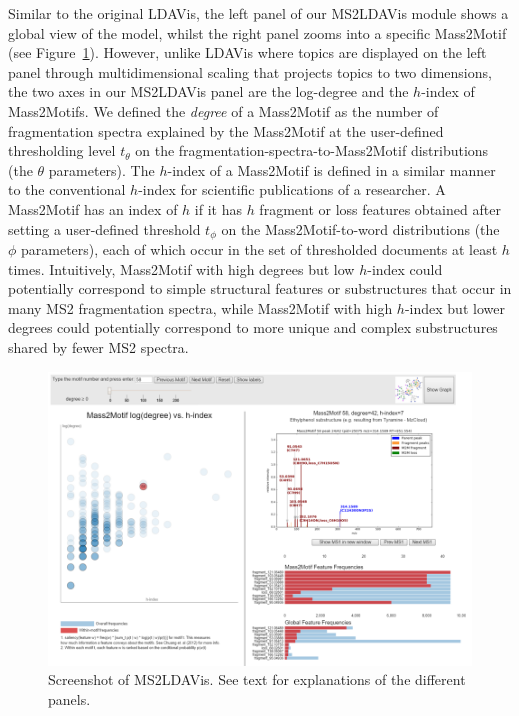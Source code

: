 Similar to the original LDAVis, the left panel of our MS2LDAVis module shows a global view of the model, whilst the right panel zooms into a specific Mass2Motif (see Figure~\ref{fig:m2ldavis-main}). However, unlike LDAVis where topics are displayed on the left panel through multidimensional scaling that projects topics to two dimensions, the two axes in our MS2LDAVis panel are the log-degree and the $h$-index of Mass2Motifs. We defined the \textit{degree} of a Mass2Motif as the number of fragmentation spectra explained by the Mass2Motif at the user-defined thresholding level $t_{\theta}$ on the fragmentation-spectra-to-Mass2Motif distributions (the $\theta$ parameters). The $h$-index of a Mass2Motif is defined in a similar manner to the conventional $h$-index for scientific publications of a researcher. A Mass2Motif has an index of $h$ if it has $h$ fragment or loss features obtained after setting a user-defined threshold $t_{\phi}$ on the Mass2Motif-to-word distributions (the $\phi$ parameters), each of which occur in the set of thresholded documents at least $h$ times. Intuitively, Mass2Motif with high degrees but low $h$-index could potentially correspond to simple structural features or substructures that occur in many MS2 fragmentation spectra, while Mass2Motif with high $h$-index but lower degrees could potentially correspond to more unique and complex substructures shared by fewer MS2 spectra.

\begin{figure}[!htbp]
\centering\includegraphics[width=1.0\linewidth]{07-lda/figures/ms2ldavis.png}
\centering\caption{Screenshot of MS2LDAVis. See text for explanations of the different panels.\label{fig:m2ldavis-main}}
\end{figure}

